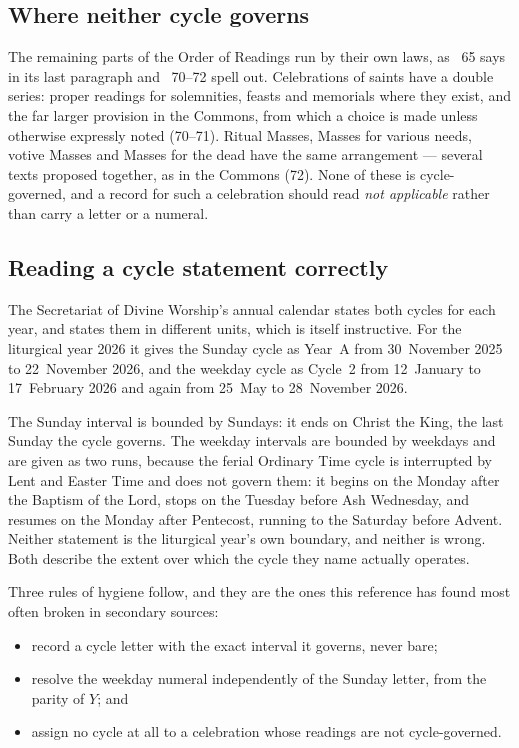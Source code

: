 \subsection{Where neither cycle governs}

The remaining parts of the Order of Readings run by their own laws, as ~65 says in its last
paragraph and ~70--72 spell out. Celebrations of saints have a double series: proper
readings for solemnities, feasts and memorials where they exist, and the far larger provision in the
Commons, from which a choice is made unless otherwise expressly noted (70--71). Ritual Masses,
Masses for various needs, votive Masses and Masses for the dead have the same arrangement --- several
texts proposed together, as in the Commons (72). None of these is cycle-governed, and a record for
such a celebration should read \emph{not applicable} rather than carry a letter or a numeral.

\subsection{Reading a cycle statement correctly}

The Secretariat of Divine Worship's annual calendar states both cycles for each year, and states
them in different units, which is itself instructive. For the liturgical year 2026 it gives the
Sunday cycle as Year~A from 30~November 2025 to 22~November 2026, and the weekday cycle as Cycle~2
from 12~January to 17~February 2026 and again from 25~May to 28~November 2026.

The Sunday interval is bounded by Sundays: it ends on Christ the King, the last Sunday the cycle
governs. The weekday intervals are bounded by weekdays and are given as two runs, because the ferial
Ordinary Time cycle is interrupted by Lent and Easter Time and does not govern them: it begins on
the Monday after the Baptism of the Lord, stops on the Tuesday before Ash Wednesday, and resumes on
the Monday after Pentecost, running to the Saturday before Advent. Neither statement is the
liturgical year's own boundary, and neither is wrong. Both describe the extent over which the cycle
they name actually operates.

Three rules of hygiene follow, and they are the ones this reference has found most often broken in
secondary sources:

\begin{itemize}
\item record a cycle letter with the exact interval it governs, never bare;
\item resolve the weekday numeral independently of the Sunday letter, from the parity of $Y$; and
\item assign no cycle at all to a celebration whose readings are not cycle-governed.
\end{itemize}
